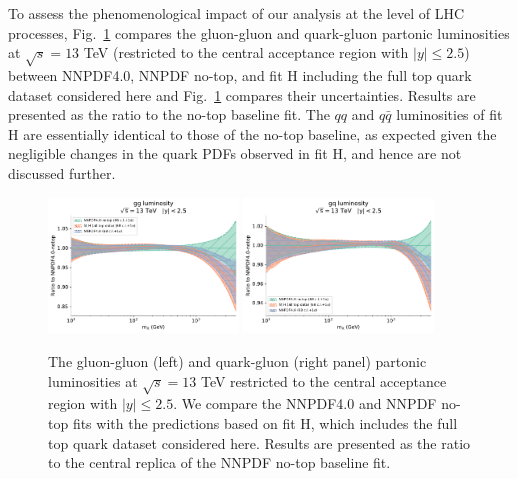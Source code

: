 \documentclass[withindex,glossary]{cam-thesis}
\begin{document}
 To assess the phenomenological impact of our analysis at the level
 of LHC processes, Fig.~\ref{fig:fith_luminosities}
 compares the gluon-gluon and quark-gluon 
  partonic luminosities at $\sqrt{s}=13$ TeV (restricted to
  the central acceptance region with $|y|\le 2.5$)
between  NNPDF4.0, NNPDF no-top, and fit H including the full top quark dataset
  considered here and Fig.~\ref{fig:fith_luminosities} compares their
  uncertainties. 
  Results are presented as the ratio to the no-top baseline fit.
  The $qq$ and $q\bar{q}$ luminosities of fit H are essentially
  identical to those of the no-top baseline, as expected given the negligible changes in the quark PDFs observed   in fit H, and hence are not discussed further. 

\begin{figure}[t]
\centering
\includegraphics[width=0.45\textwidth]{pdf_plots/fitH_gg_lumi.pdf}
\includegraphics[width=0.45\textwidth]{pdf_plots/fitH_gq_lumi.pdf}
\caption{The gluon-gluon (left) and quark-gluon (right panel)
  partonic luminosities at $\sqrt{s}=13$ TeV restricted to
  the central acceptance region with $|y|\le 2.5$.
  We compare the NNPDF4.0 and NNPDF no-top fits with the
  predictions based on fit H, which includes the full top quark dataset
  considered here.
  Results are presented as the ratio to the central replica of the NNPDF no-top baseline fit.
}
\label{fig:fith_luminosities}
\end{figure}
\end{document}
